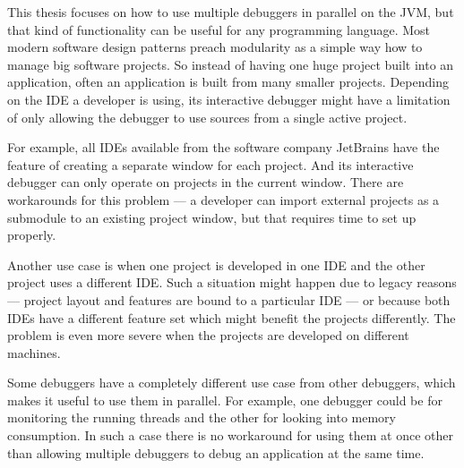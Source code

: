 \documentclass[..thesis.tex]{subfiles}
\begin{document}
This thesis focuses on how to use multiple debuggers in parallel on the JVM, but that kind of functionality can be useful for any programming language. 
Most modern software design patterns preach modularity as a simple way how to manage big software projects.
So instead of having one huge project built into an application, often an application is built from many smaller projects.
Depending on the IDE a developer is using, its interactive debugger might have a limitation of only allowing the debugger to use sources from a single active project.

For example, all IDEs available from the software company JetBrains have the feature of creating a separate window for each project.
And its interactive debugger can only operate on projects in the current window.
There are workarounds for this problem --- a developer can import external projects as a submodule to an existing project window, but that requires time to set up properly.

Another use case is when one project is developed in one IDE and the other project uses a different IDE.
Such a situation might happen due to legacy reasons --- project layout and features are bound to a particular IDE --- or because both IDEs have a different feature set which might benefit the projects differently.
The problem is even more severe when the projects are developed on different machines.

Some debuggers have a completely different use case from other debuggers, which makes it useful to use them in parallel.
For example, one debugger could be for monitoring the running threads and the other for looking into memory consumption.
In such a case there is no workaround for using them at once other than allowing multiple debuggers to debug an application at the same time.
% 
% 
\end{document}
